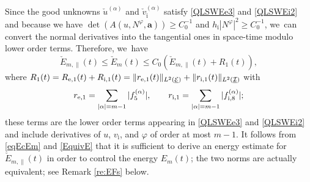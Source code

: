 \documentclass[10pt]{amsart}
\newcommand{\cI}{{\mathcal I}}
\newcommand{\cE}{{\mathcal E}}
\newcommand{\ul}[1]{\underline{#1}}
\theoremstyle{definition}
\begin{document}
Since the good unknowns $\check{u}^{(\alpha)}$ and $\check{v}_\mathrm{i}^{(\alpha)}$ satisfy \eqref{QLSWEe3} and \eqref{QLSWEi2} and because we have
$\det(A(u,N^\varphi,\bm{a})) \geq C_0^{-1}$ and $h_\mathrm{i}|N^\varphi|^2 \geq C_0^{-1}$, we~can convert the normal derivatives into the tangential ones in space-time modulo lower order terms.
Therefore, we~have
\begin{equation}\label{EquivE}
\check{E}_{m,\parallel}(t) \leq \check{E}_m(t) \leq C_0(\check{E}_{m,\parallel}(t) + R_1(t)),
\end{equation}
where $R_1(t)=R_{{\rm e},1}(t)+R_{{\rm i},1}(t)=\|r_{{\rm e},1}(t)\|_{L^2(\ul{\cE})}+\|r_{{\rm i},1}(t)\|_{L^2(\ul{\cI})}$ with
\[
r_{{\rm e},1} = \sum_{|\alpha|=m-1} |f_5^{(\alpha)}|, \qquad
r_{{\rm i},1} = \sum_{|\alpha|=m-1} |f_{{\rm i},8}^{(\alpha)}|;
\]
these terms are the lower order terms appearing in \eqref{QLSWEe3} and \eqref{QLSWEi2}
and include derivatives of $u$, $v_\mathrm{i}$, and $\varphi$ of order at most $m-1$.
It follows from \eqref{eqEcEm} and \eqref{EquivE} that it is sufficient to derive an energy estimate for $\check{E}_{m,\parallel}(t)$
in order to control the energy $E_m(t)$; the two norms are actually equivalent; see Remark \ref{re:EFs} below.
\end{document}
